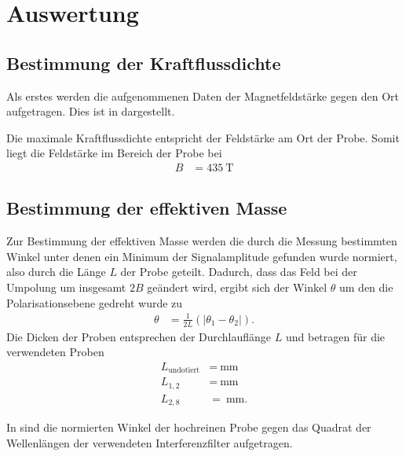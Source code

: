 \section{Auswertung}
\label{sec:Auswertung}


\subsection{Bestimmung der Kraftflussdichte}
\label{sub:Kraftflussdichte}

Als erstes werden die aufgenommenen Daten der Magnetfeldstärke gegen den Ort aufgetragen.
Dies ist in
dargestellt.


Die maximale Kraftflussdichte entspricht der Feldstärke am Ort der Probe.
Somit liegt die Feldstärke im Bereich der Probe bei 
\begin{align*}
  B &= \qty{435}{\tesla}
\end{align*}

\subsection{Bestimmung der effektiven Masse}
\label{sub:effektiveMasse}

Zur Bestimmung der effektiven Masse werden die durch die Messung bestimmten Winkel unter denen ein Minimum der Signalamplitude gefunden wurde
normiert, also durch die Länge $L$ der Probe geteilt.
Dadurch, dass das Feld bei der Umpolung um insgesamt $\num{2}B$ geändert wird, ergibt sich der Winkel $\theta$ um den die Polarisationsebene
gedreht wurde zu
\begin{align}
  \theta &= \frac{1}{2L}(\lvert \theta_1-\theta_2 \rvert).
\end{align}
Die Dicken der Proben entsprechen der Durchlauflänge $L$ und betragen für die verwendeten Proben
\begin{align*}
  L_{\text{undotiert}}&= \qty{}{\milli\meter}\\
  L_{1,2}&= \qty{}{\milli\meter}\\
  L_{2,8}&= \qty{}{\milli\meter}.
\end{align*}

In
sind die normierten Winkel der hochreinen Probe gegen das Quadrat der Wellenlängen der verwendeten Interferenzfilter aufgetragen.


